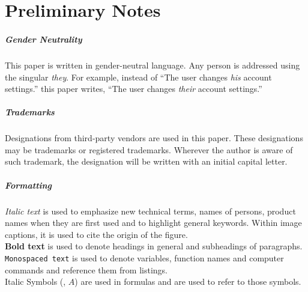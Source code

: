 
\clearpage
\chapter*{Preliminary Notes}
\label{chap:prenotes}
\thispagestyle{scrheadings}

\paragraph{Gender Neutrality}
This paper is written in gender-neutral language. Any person is addressed using the singular \emph{they}. For example, instead of  \enquote{The user changes \emph{his} account settings.} this paper writes, \enquote{The user changes \emph{their} account settings.}

\paragraph{Trademarks}
Designations from third-party vendors are used in this paper. These designations may be trademarks or registered trademarks. Wherever the author is aware of such trademark, the designation will be written with an initial capital letter.

\paragraph{Formatting}
\textit{Italic text} is used to emphasize new technical terms, names of persons, product names when they are first used and to highlight general keywords. Within image captions, it is used to cite the origin of the figure.\\ 
\textbf{Bold text} is used to denote headings in general and subheadings of paragraphs.\\ 
\texttt{Monospaced text} is used to denote variables, function names and computer commands and reference them from listings.\\
Italic Symbols (\eg, $A$) are used in formulas and are used to refer to those symbols.
